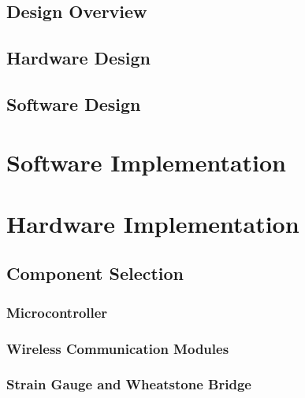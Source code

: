 \documentclass{l3proj}
\begin{document}
\section{Design Overview}



\section{Hardware Design}



\section{Software Design}

\chapter{Software Implementation}
\label{chap:software impl}

\chapter{Hardware Implementation}


\section{Component Selection}

\subsection{Microcontroller}


\subsection{Wireless Communication Modules}


\subsection{Strain Gauge and Wheatstone Bridge}



\label{sec:strain}
\end{document}
